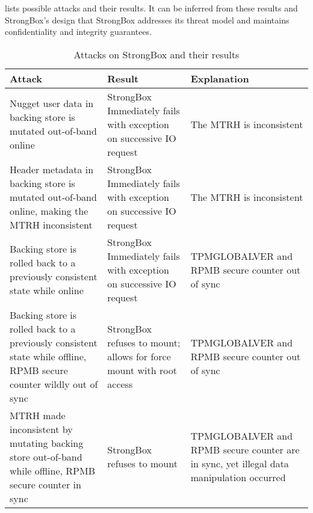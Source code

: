  lists possible attacks and their results. It can be inferred
from these results and StrongBox's design that StrongBox addresses its threat
model and maintains confidentiality and integrity guarantees.

\begin{table}[t]
  \caption{Attacks on StrongBox and their results}\label{tbl:security}
  \footnotesize
  \centering
  \begin{tabu} to \linewidth { | X[l] | X[c] | X[c] | }
    \hline
    \textbf{Attack} & \textbf{Result} & \textbf{Explanation} \\
    \hline\hline
    Nugget user data in backing store is mutated out-of-band online & StrongBox Immediately fails with exception on successive IO request & The MTRH is inconsistent \\
    \hline
    Header metadata in backing store is mutated out-of-band online, making the MTRH inconsistent & StrongBox Immediately fails with exception on successive IO request & The MTRH is inconsistent \\
    \hline
    Backing store is rolled back to a previously consistent state while online & StrongBox Immediately fails with exception on successive IO request & TPMGLOBALVER and RPMB secure counter out of sync \\
    \hline
    Backing store is rolled back to a previously consistent state while offline, RPMB secure counter wildly out of sync & StrongBox refuses to mount; allows for force mount with root access & TPMGLOBALVER and RPMB secure counter out of sync \\
    \hline
    MTRH made inconsistent by mutating backing store out-of-band while offline, RPMB secure counter in sync & StrongBox refuses to mount & TPMGLOBALVER and RPMB secure counter are in sync, yet illegal data manipulation occurred \\
    \hline\hline
  \end{tabu}
\end{table}
